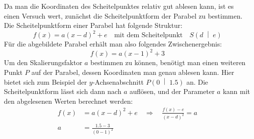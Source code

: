 \begin{exercise}
\begin{center}
    \end{center}
  \fi
  \ifoutcome\outcome\par
    Da man die Koordinaten des Scheitelpunktes
    relativ gut ablesen kann, ist es einen Versuch
    wert, zunächst die Scheitelpunktform der
    Parabel zu bestimmen. Die Scheitelpunktform
    einer Parabel hat folgende Struktur:
    \begin{equation*}
      f(x)=a(x-d)^2+e
      \quad
      \text{mit dem Scheitelpunkt}
      \quad
      S\left(d\;\middle|\;e\right)
    \end{equation*}
    Für die abgebildete Parabel erhält man also
    folgendes Zwischenergebnis:
    \begin{equation*}
      f(x)=a(x-1)^2+3
    \end{equation*}
    Um den Skalierungsfaktor $a$ bestimmen zu
    können, benötigt man einen weiteren Punkt
    $P$ auf der Parabel, dessen Koordinaten
    man genau ablesen kann.
    Hier bietet sich zum Beispiel der
    $y$-Achsen\-ab\-schnitt
    $P\left(0\;\middle|\;\num{1.5}\right)$ an.
    Die Scheitelpunktform lässt sich dann nach
    $a$ auflösen, und der Parameter $a$
    kann mit den abgelesenen Werten berechnet
    werden:
    \begin{equation*}
      \begin{split}
        f(x)&=a(x-d)^2+e
        \quad\Rightarrow\quad
        \frac{f(x)-e}{(x-d)^2}=a
        \\
        a&=\frac{\num{1.5}-\num{3}}{(\num{0}-\num{1})^2}

\end{split}
\end{equation*}
\end{exercise}
